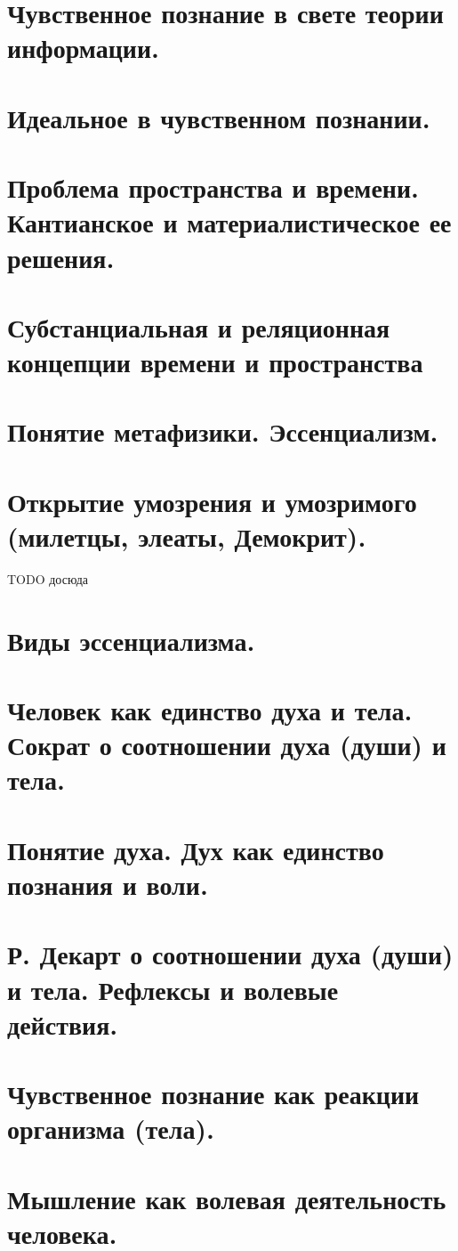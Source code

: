 \section{ Чувственное познание в свете теории информации.}
\section{ Идеальное в чувственном познании.}
\section{ Проблема пространства и времени. Кантианское и материалистическое ее решения.}
\section{ Субстанциальная и реляционная концепции времени и пространства}
\section{ Понятие метафизики. Эссенциализм.}
\section{ Открытие умозрения и умозримого (милетцы, элеаты, Демокрит).}

TODO досюда

\section{ Виды эссенциализма.}
\section{ Человек как единство духа и тела. Сократ о соотношении духа (души) и тела.}
\section{ Понятие духа. Дух как единство познания и воли.}
\section{ Р. Декарт о соотношении духа (души) и тела. Рефлексы и волевые действия.}
\section{ Чувственное познание как реакции организма (тела).}
\section{ Мышление как волевая деятельность человека.}
